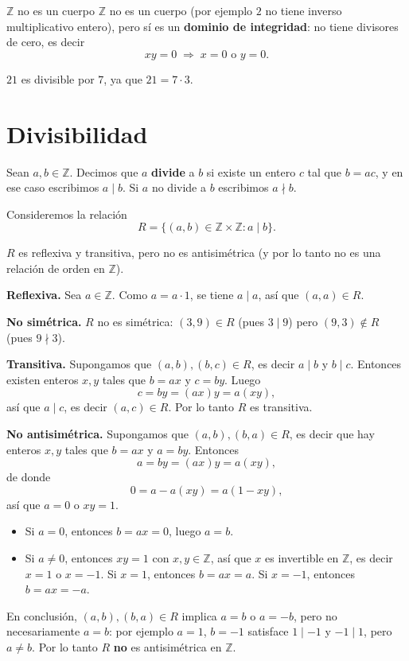 \begin{nota}{$\mathbb{Z}$ no es un cuerpo}
$\mathbb{Z}$ no es un cuerpo (por ejemplo $2$ no tiene inverso
multiplicativo entero), pero sí es un \textbf{dominio de integridad}:
no tiene divisores de cero, es decir
\[
xy = 0 \;\Longrightarrow\; x=0 \text{ o } y=0.
\]
\end{nota}

\begin{ejemplo}
$21$ es divisible por $7$, ya que $21 = 7\cdot 3$.
\end{ejemplo}

\section{Divisibilidad}

\begin{definicion}
Sean $a,b \in \mathbb{Z}$. Decimos que $a$ \textbf{divide} a $b$ si
existe un entero $c$ tal que $b=ac$, y en ese caso escribimos $a\mid b$.
Si $a$ no divide a $b$ escribimos $a \nmid b$.
\end{definicion}

\begin{proposicion}
Consideremos la relación
\[
R = \{ (a,b) \in \mathbb{Z} \times \mathbb{Z} : a \mid b \}.
\]


$R$ es reflexiva y transitiva, pero no es antisimétrica (y por lo tanto
no es una relación de orden en $\mathbb{Z}$).
\end{proposicion}

\begin{demostracion}
\textbf{Reflexiva.} Sea $a \in \mathbb{Z}$. Como $a=a\cdot 1$, se tiene
$a\mid a$, así que $(a,a) \in R$.

\textbf{No simétrica.} $R$ no es simétrica: $(3,9) \in R$ (pues
$3\mid 9$) pero $(9,3) \notin R$ (pues $9 \nmid 3$).

\textbf{Transitiva.} Supongamos que $(a,b),(b,c) \in R$, es decir
$a\mid b$ y $b \mid c$. Entonces existen enteros $x,y$ tales que $b=ax$
y $c=by$. Luego
\[
c = by = (ax)y = a(xy),
\]
así que $a \mid c$, es decir $(a,c) \in R$. Por lo tanto $R$ es
transitiva.

\textbf{No antisimétrica.} Supongamos que $(a,b),(b,a) \in R$, es decir
que hay enteros $x,y$ tales que $b=ax$ y $a=by$. Entonces
\[
a = by = (ax)y = a(xy),
\]
de donde
\[
0 = a - a(xy) = a(1-xy),
\]
así que $a=0$ o $xy=1$.

\begin{itemize}
    \item Si $a=0$, entonces $b=ax=0$, luego $a=b$.
    \item Si $a\neq 0$, entonces $xy=1$ con $x,y \in \mathbb{Z}$, así
    que $x$ es invertible en $\mathbb{Z}$, es decir $x=1$ o $x=-1$.
    Si $x=1$, entonces $b=ax=a$. Si $x=-1$, entonces $b=ax=-a$.
\end{itemize}

En conclusión, $(a,b),(b,a)\in R$ implica $a=b$ o $a=-b$, pero no
necesariamente $a=b$: por ejemplo $a=1$, $b=-1$ satisface $1\mid -1$ y
$-1\mid 1$, pero $a\neq b$. Por lo tanto $R$ \textbf{no} es
antisimétrica en $\mathbb{Z}$.
\end{demostracion}

